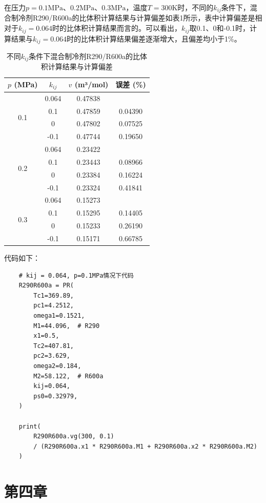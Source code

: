 \documentclass[12pt,a4paper]{article}
\begin{document}
在压力$p=0.1\mathrm{MPa}$、$0.2\mathrm{MPa}$、$0.3\mathrm{MPa}$，温度$T=300\mathrm{K}$时，不同的$k_{ij}$条件下，混合制冷剂R290/R600a的比体积计算结果与计算偏差如表1所示，表中计算偏差是相对于$k_{ij}=0.064$时的比体积计算结果而言的。可以看出，$k_{ij}$取0.1、0和-0.1时，计算结果与$k_{ij}=0.064$时的比体积计算结果偏差逐渐增大，且偏差均小于1\%。
\begin{table}[h]
\centering
\begin{tabular}{c c c c}
\hline
$p$ (MPa) & $k_{ij}$ &  $v$ (m³/mol) &误差 (\%) \\
\hline
\multirow{4}{*}{0.1} & 0.064 & 0.47838 &   \\
 & 0.1 & 0.47859 & 0.04390\\
 & 0 & 0.47802 & 0.07525  \\
 & -0.1 & 0.47744 & 0.19650  \\
\hline
\multirow{4}{*}{0.2} & 0.064 & 0.23422 &   \\
 & 0.1 & 0.23443 & 0.08966  \\
 & 0 & 0.23384 & 0.16224  \\
 & -0.1 & 0.23324 & 0.41841  \\
\hline
\multirow{4}{*}{0.3} & 0.064 & 0.15273 &   \\
 & 0.1 & 0.15295 & 0.14405  \\
 & 0 & 0.15233 & 0.26190  \\
 & -0.1 & 0.15171 & 0.66785  \\
\hline
\end{tabular}
\caption{不同$k_{ij}$条件下混合制冷剂R290/R600a的比体积计算结果与计算偏差}
\end{table}

代码如下：

\begin{lstlisting}
    # kij = 0.064, p=0.1MPa情况下代码
    R290R600a = PR(
        Tc1=369.89,
        pc1=4.2512,
        omega1=0.1521,
        M1=44.096,  # R290
        x1=0.5,
        Tc2=407.81,
        pc2=3.629,
        omega2=0.184,
        M2=58.122,  # R600a
        kij=0.064,
        ps0=0.32979,
    )

    print(
        R290R600a.vg(300, 0.1)
        / (R290R600a.x1 * R290R600a.M1 + R290R600a.x2 * R290R600a.M2)
    )
\end{lstlisting}

\newpage

\section*{第四章}
\end{document}
